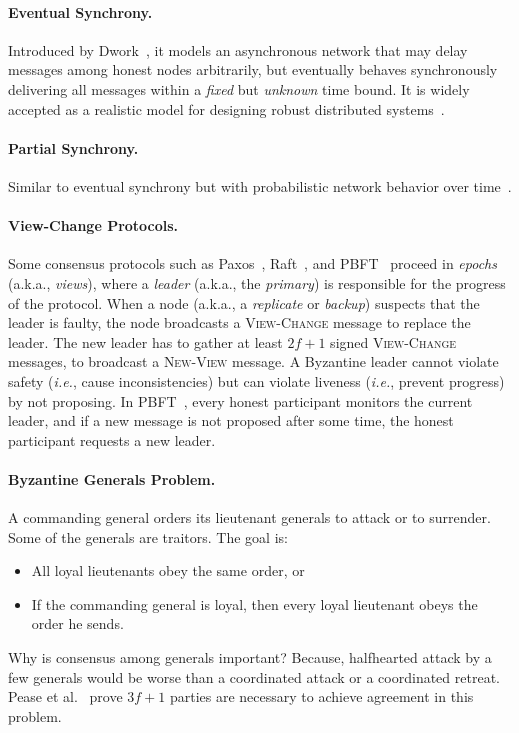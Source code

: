 \documentclass[11pt]{article}
\newcommand{\ie}{\textit{i.e.}}
\theoremstyle{mytheoremstyle}
\begin{document}
\paragraph{Eventual Synchrony.} Introduced by Dwork~\cite{dwork:1988:cpp}, it models an asynchronous network that may delay messages among honest nodes arbitrarily, but eventually behaves synchronously delivering all messages within a \emph{fixed} but \emph{unknown} time bound. It is widely accepted as a realistic model for designing robust distributed systems~\cite{DBLP:journals/corr/CachinV17}.

\paragraph{Partial Synchrony.} Similar to eventual synchrony but with probabilistic network behavior over time~\cite{dwork:1988:cpp}.

\paragraph{View-Change Protocols.} Some consensus protocols such as Paxos~\cite{lamport:1998:Paxos}, Raft~\cite{raft:2014}, and PBFT~\cite{pbft:99} proceed in \emph{epochs} (a.k.a., \emph{views}), where a \emph{leader} (a.k.a., the \emph{primary}) is responsible for the progress of the protocol. When a node (a.k.a., a \emph{replicate} or \emph{backup}) suspects that the leader is faulty, the node broadcasts a \textsc{View-Change} message to replace the leader. The new leader has to gather at least $2f+1$ signed \textsc{View-Change} messages, to broadcast a \textsc{New-View} message. A Byzantine leader cannot violate safety (\ie, cause inconsistencies) but can violate liveness (\ie, prevent progress) by not proposing. In PBFT~\cite{pbft:99}, every honest participant monitors the current leader, and if a new message is not proposed after some time, the honest participant requests a new leader.

\paragraph{Byzantine Generals Problem.} A commanding general orders its lieutenant generals to attack or to surrender. Some of the generals are traitors. The goal is:
\begin{itemize}
	\item All loyal lieutenants obey the same order, or
	\item If the commanding general is loyal, then every loyal lieutenant obeys the order he sends.
\end{itemize}

Why is consensus among generals important? Because, halfhearted attack by a few generals would be worse than a coordinated attack or a coordinated retreat. Pease et al.~\cite{pease80reaching} prove $3f+1$ parties are necessary to achieve agreement in this problem.


\end{document}
